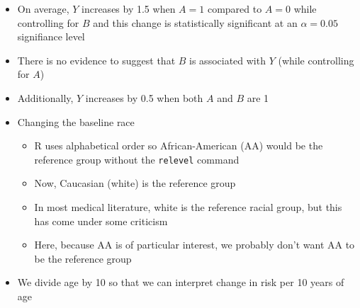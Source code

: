 \documentclass[
]{article}
\newenvironment{Shaded}{\begin{snugshade}}{\end{snugshade}}
\newcommand{\AttributeTok}[1]{\textcolor[rgb]{0.77,0.63,0.00}{#1}}
\newcommand{\DecValTok}[1]{\textcolor[rgb]{0.00,0.00,0.81}{#1}}
\newcommand{\FunctionTok}[1]{\textcolor[rgb]{0.00,0.00,0.00}{#1}}
\newcommand{\NormalTok}[1]{#1}
\newcommand{\OtherTok}[1]{\textcolor[rgb]{0.56,0.35,0.01}{#1}}
\newcommand{\SpecialCharTok}[1]{\textcolor[rgb]{0.00,0.00,0.00}{#1}}
\newcommand{\StringTok}[1]{\textcolor[rgb]{0.31,0.60,0.02}{#1}}
\providecommand{\tightlist}{%
  \setlength{\itemsep}{0pt}\setlength{\parskip}{0pt}}
\begin{document}
\begin{itemize}
\item
  On average, \(Y\) increases by 1.5 when \(A=1\) compared to \(A=0\)
  while controlling for \(B\) and this change is statistically
  significant at an \(\alpha=0.05\) signifiance level
\item
  There is no evidence to suggest that \(B\) is associated with \(Y\)
  (while controlling for \(A\))
\item
  Additionally, \(Y\) increases by 0.5 when both \(A\) and \(B\) are 1
\item
  Changing the baseline race

  \begin{itemize}
  \tightlist
  \item
    R uses alphabetical order so African-American (AA) would be the
    reference group without the \texttt{relevel} command
  \item
    Now, Caucasian (white) is the reference group
  \item
    In most medical literature, white is the reference racial group, but
    this has come under some criticism
  \item
    Here, because AA is of particular interest, we probably don't want
    AA to be the reference group
  \end{itemize}
\item
  We divide age by 10 so that we can interpret change in risk per 10
  years of age
\end{itemize}

\begin{Shaded}
\end{Shaded}
\end{document}
